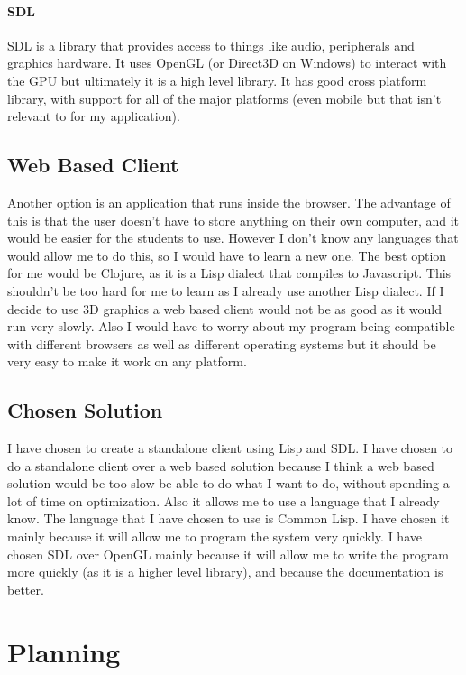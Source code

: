 \paragraph{SDL}
SDL is a library that provides access to things like audio, peripherals and
graphics hardware. It uses OpenGL (or Direct3D on Windows) to interact with the
GPU but ultimately it is a high level library. It has good cross platform
library, with support for all of the major platforms (even mobile but that isn't
relevant to for my application).

\subsection{Web Based Client}
Another option is an application that runs inside the browser. The advantage of
this is that the user doesn't have to store anything on their own computer, and
it would be easier for the students to use. However I don't know any languages
that would allow me to do this, so I would have to learn a new one. The best
option for me would be Clojure, as it is a Lisp dialect that compiles to
Javascript. This shouldn't be too hard for me to learn as I already use another
Lisp dialect. If I decide to use 3D graphics a web based client would not be as
good as it would run very slowly. Also I would have to worry about my program
being compatible with different browsers as well as different operating systems
but it should be very easy to make it work on any platform. 

\subsection{Chosen Solution}
I have chosen to create a standalone client using Lisp and SDL. I have chosen to
do a standalone client over a web based solution because I think a web based
solution would be too slow be able to do what I want to do, without spending a
lot of time on optimization. Also it allows me to use a language that I already
know. The language that I have chosen to use is Common Lisp. I have chosen it
mainly because it will allow me to program the system very quickly. I have
chosen SDL over OpenGL mainly because it will allow me to write the program more
quickly (as it is a higher level library), and because the documentation is
better.

\section{Planning}

